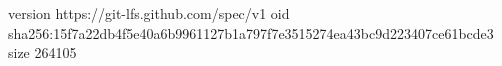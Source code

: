 version https://git-lfs.github.com/spec/v1
oid sha256:15f7a22db4f5e40a6b9961127b1a797f7e3515274ea43bc9d223407ce61bcde3
size 264105
